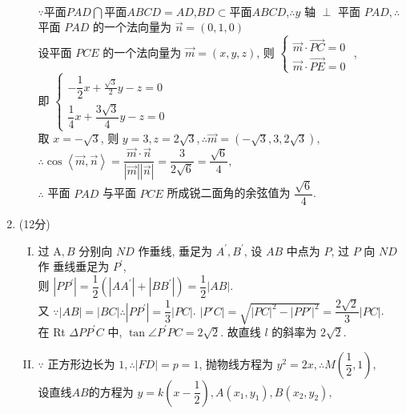 \documentclass[11pt]{article}
\begin{document}
\begin{enumerate}
\begin{enumerate}[(I)]
		\\$ \because $平面$ PAD \bigcap $平面$ ABCD =AD$,$ BD\subset  $平面$ ABCD $,$\therefore y$ 轴 $\perp$ 平面 $P A D, \therefore$ 平面 $P A D$ 的一个法向量为 $\vec{n}=(0,1,0)$
		\\设平面 $P C E$ 的一个法向量为 $\vec{m}=(x, y, z)$, 则 $\left\{\begin{array}{l}\vec{m} \cdot \overrightarrow{P C}=0 \\ \vec{m} \cdot \overrightarrow{P E}=0\end{array}\right.$ ,
		\\即 $\left\{\begin{array}{l}-\dfrac{1}{2} x+\frac{\sqrt{3}}{2} y-z=0 \\ \dfrac{1}{4} x+\dfrac{3 \sqrt{3}}{4} y-z=0\end{array}\right.$
		\\取 $x=-\sqrt{3}$, 则 $y=3, z=2 \sqrt{3},$$ \therefore \vec{m}=(-\sqrt{3}, 3,2 \sqrt{3}), $
		\\$\therefore \cos \left \langle \vec{m},\vec{n}   \right \rangle =\dfrac{\vec{m} \cdot \vec{n}}{|\vec{m}||\vec{n}|}=\dfrac{3}{2 \sqrt{6}}=\dfrac{\sqrt{6}}{4}, $
		\\$\therefore$ 平面 $P A D$
		与平面 $P C E$ 所成锐二面角的余弦值为 $\dfrac{\sqrt{6}}{4}$.
	\end{enumerate}
	\item (12分)
	\begin{enumerate}[(I)]
		\item 过 $\mathrm{A}, B$ 分别向 $N D$ 作垂线, 垂足为 $A^{\prime}, B^{\prime}$, 设 $A B$ 中点为 $P$, 过 $P$ 向 $N D$ 作 垂线垂足为 $P^{\prime}$, 
		\\则 $\left|P P^{\prime}\right|=\dfrac{1}{2}\left(\left|A A^{\prime}\right|+\left|B B^{\prime}\right|\right)=\dfrac{1}{2}|A B|$.
		\\又 $\because|A B|=|B C| \therefore\left|P P^{\prime}\right|=\dfrac{1}{3}|P C|$. $ \left | P'C \right | =\sqrt{\left | PC \right |^2-\left | PP' \right |^2  }=\dfrac{2\sqrt{2} }{3}\left | PC \right |   $.
		\\在 Rt $\Delta P P^{\prime} C$ 中, $\tan \angle P^{\prime} P C=2 \sqrt{2}$. 故直线 $l$ 的斜率为 $2 \sqrt{2}$.
		\item $\because$ 正方形边长为 $1, \therefore \left | FD \right | =p=1$, 抛物线方程为 $y^{2}=2 x, \therefore M\left(\dfrac{1}{2}, 1\right)$, 
		\\设直线$ AB $的方程为
		$y=k\left(x-\dfrac{1}{2}\right), A\left(x_{1}, y_{1}\right), B\left(x_{2}, y_{2}\right), $

\end{enumerate}
\end{enumerate}
\end{document}
